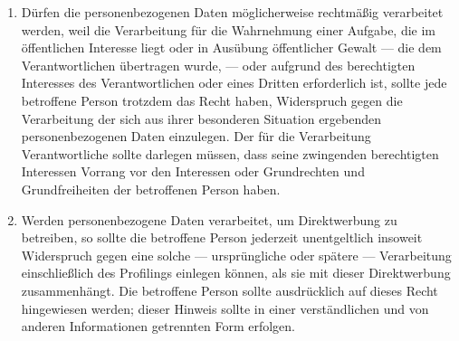 \begin{enumerate}

   \item Dürfen die personenbezogenen Daten möglicherweise rechtmäßig verarbeitet werden, weil die Verarbeitung für die
    Wahrnehmung einer Aufgabe, die im öffentlichen Interesse liegt oder in Ausübung öffentlicher Gewalt — die dem
    Verantwortlichen übertragen wurde, — oder aufgrund des berechtigten Interesses des Verantwortlichen oder eines
    Dritten erforderlich ist, sollte jede betroffene Person trotzdem das Recht haben, Widerspruch gegen die
    Verarbeitung der sich aus ihrer besonderen Situation ergebenden personenbezogenen Daten einzulegen. Der für die
    Verarbeitung Verantwortliche sollte darlegen müssen, dass seine zwingenden berechtigten Interessen Vorrang vor den
    Interessen oder Grundrechten und Grundfreiheiten der betroffenen Person haben.%
   \label{eg:69}
   

   \item Werden personenbezogene Daten verarbeitet, um Direktwerbung zu betreiben, so sollte die betroffene Person
    jederzeit unentgeltlich insoweit Widerspruch gegen eine solche — ursprüngliche oder spätere — Verarbeitung
    einschließlich des Profilings einlegen können, als sie mit dieser Direktwerbung zusammenhängt. Die betroffene
    Person sollte ausdrücklich auf dieses Recht hingewiesen werden; dieser Hinweis sollte in einer verständlichen und
    von anderen Informationen getrennten Form erfolgen.%
   \label{eg:70}
   


\end{enumerate}
